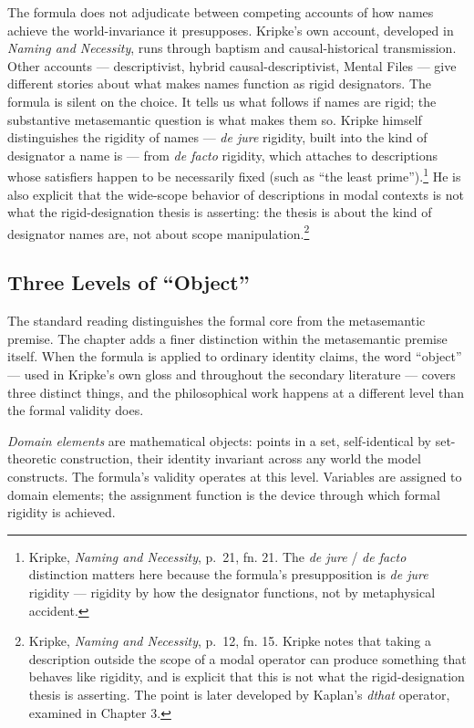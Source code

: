\documentclass[12pt,a4paper]{article}
\begin{document}
The formula does not adjudicate between competing accounts of how names achieve the world-invariance it presupposes. Kripke's own account, developed in \emph{Naming and Necessity}, runs through baptism and causal-historical transmission. Other accounts --- descriptivist, hybrid causal-descriptivist, Mental Files --- give different stories about what makes names function as rigid designators. The formula is silent on the choice. It tells us what follows if names are rigid; the substantive metasemantic question is what makes them so. Kripke himself distinguishes the rigidity of names --- \emph{de jure} rigidity, built into the kind of designator a name is --- from \emph{de facto} rigidity, which attaches to descriptions whose satisfiers happen to be necessarily fixed (such as ``the least prime'').\footnote{Kripke, \emph{Naming and Necessity}, p.~21, fn. 21. The \emph{de jure} / \emph{de facto} distinction matters here because the formula's presupposition is \emph{de jure} rigidity --- rigidity by how the designator functions, not by metaphysical accident.} He is also explicit that the wide-scope behavior of descriptions in modal contexts is not what the rigid-designation thesis is asserting: the thesis is about the kind of designator names are, not about scope manipulation.\footnote{Kripke, \emph{Naming and Necessity}, p.~12, fn. 15. Kripke notes that taking a description outside the scope of a modal operator can produce something that behaves like rigidity, and is explicit that this is not what the rigid-designation thesis is asserting. The point is later developed by Kaplan's \emph{dthat} operator, examined in Chapter 3.}

\subsection{Three Levels of ``Object''}\label{three-levels-of-object}

The standard reading distinguishes the formal core from the metasemantic premise. The chapter adds a finer distinction within the metasemantic premise itself. When the formula is applied to ordinary identity claims, the word ``object'' --- used in Kripke's own gloss and throughout the secondary literature --- covers three distinct things, and the philosophical work happens at a different level than the formal validity does.

\emph{Domain elements} are mathematical objects: points in a set, self-identical by set-theoretic construction, their identity invariant across any world the model constructs. The formula's validity operates at this level. Variables are assigned to domain elements; the assignment function is the device through which formal rigidity is achieved.
\end{document}
